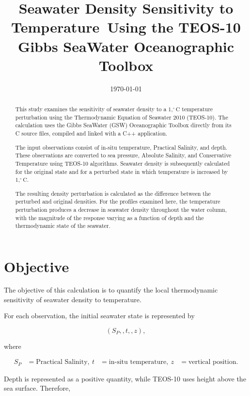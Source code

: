 \documentclass[11pt]{article}
\title{Seawater Density Sensitivity to Temperature\
Using the TEOS-10 Gibbs SeaWater Oceanographic Toolbox}
\author{}
\date{\today}
\begin{document}
\maketitle

\begin{abstract}

This study examines the sensitivity of seawater density to a
$1,^\circ\mathrm{C}$ temperature perturbation using the
Thermodynamic Equation of Seawater 2010 (TEOS-10). The calculation
uses the Gibbs SeaWater (GSW) Oceanographic Toolbox directly from its
C source files, compiled and linked with a C++ application.

The input observations consist of in-situ temperature, Practical
Salinity, and depth. These observations are converted to sea pressure,
Absolute Salinity, and Conservative Temperature using TEOS-10
algorithms. Seawater density is subsequently calculated for the
original state and for a perturbed state in which temperature is
increased by $1,^\circ\mathrm{C}$.

The resulting density perturbation is calculated as the difference
between the perturbed and original densities. For the profiles examined
here, the temperature perturbation produces a decrease in seawater
density throughout the water column, with the magnitude of the response
varying as a function of depth and the thermodynamic state of the
seawater.

\end{abstract}

\section{Objective}

The objective of this calculation is to quantify the local
thermodynamic sensitivity of seawater density to temperature.

For each observation, the initial seawater state is represented by

\begin{equation}
\left(S_P,,t,,z\right),
\end{equation}

where

\begin{align}
S_P &= \text{Practical Salinity},\
t &= \text{in-situ temperature},\
z &= \text{vertical position}.
\end{align}

Depth is represented as a positive quantity, while TEOS-10 uses
height above the sea surface. Therefore,
\end{document}
